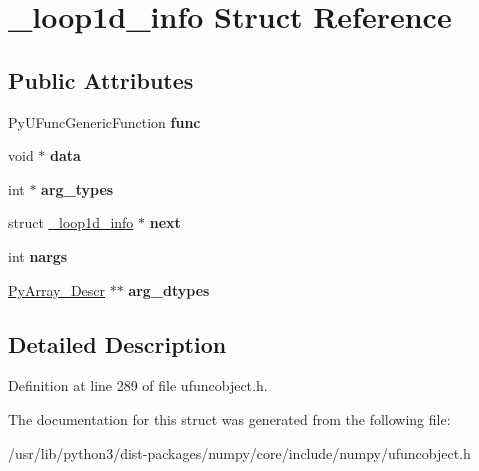 \hypertarget{struct__loop1d__info}{}\section{\+\_\+loop1d\+\_\+info Struct Reference}
\label{struct__loop1d__info}
\subsection*{Public Attributes}
\begin{DoxyCompactItemize}
\item 
Py\+U\+Func\+Generic\+Function {\bfseries func}\hypertarget{struct__loop1d__info_a4e3115af04d18d092b589f6dce4e9df8}{}\label{struct__loop1d__info_a4e3115af04d18d092b589f6dce4e9df8}

\item 
void $\ast$ {\bfseries data}\hypertarget{struct__loop1d__info_adb8b19c076973096ff77543633aeccfa}{}\label{struct__loop1d__info_adb8b19c076973096ff77543633aeccfa}

\item 
int $\ast$ {\bfseries arg\+\_\+types}\hypertarget{struct__loop1d__info_aff4b878c37b522548dbe11391db7fbbd}{}\label{struct__loop1d__info_aff4b878c37b522548dbe11391db7fbbd}

\item 
struct \hyperlink{struct__loop1d__info}{\+\_\+loop1d\+\_\+info} $\ast$ {\bfseries next}\hypertarget{struct__loop1d__info_a30469bb7fdff4dfe077d3f6f9d0be019}{}\label{struct__loop1d__info_a30469bb7fdff4dfe077d3f6f9d0be019}

\item 
int {\bfseries nargs}\hypertarget{struct__loop1d__info_a733e2a40b1b5938e2f43d34bbfaf1d55}{}\label{struct__loop1d__info_a733e2a40b1b5938e2f43d34bbfaf1d55}

\item 
\hyperlink{struct__PyArray__Descr}{Py\+Array\+\_\+\+Descr} $\ast$$\ast$ {\bfseries arg\+\_\+dtypes}\hypertarget{struct__loop1d__info_a8fe1d4d1b1c9bdb29ece256acf82683e}{}\label{struct__loop1d__info_a8fe1d4d1b1c9bdb29ece256acf82683e}

\end{DoxyCompactItemize}


\subsection{Detailed Description}


Definition at line 289 of file ufuncobject.\+h.



The documentation for this struct was generated from the following file\+:\begin{DoxyCompactItemize}
\item 
/usr/lib/python3/dist-\/packages/numpy/core/include/numpy/ufuncobject.\+h\end{DoxyCompactItemize}
